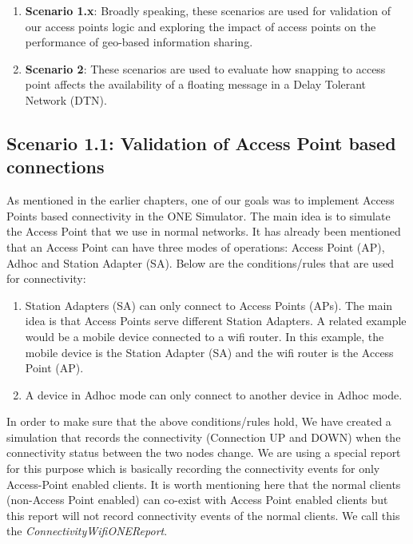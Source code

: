 \begin{enumerate}
	\item \textbf{Scenario 1.x}: Broadly speaking, these scenarios are used for validation of our access points logic and exploring the impact of access points on the performance of geo-based information sharing.
	\item \textbf{Scenario 2}: These scenarios are used to evaluate how snapping to access point affects the availability of a floating message in a Delay Tolerant Network (DTN).
\end{enumerate}
\newpage
\subsection{Scenario 1.1: Validation of Access Point based connections}
As mentioned in the earlier chapters, one of our goals was to implement Access Points based connectivity in the ONE Simulator. The main idea is to simulate the Access Point that we use in normal networks. It has already been mentioned that an Access Point can have three modes of operations: Access Point (AP), Adhoc and Station Adapter (SA). Below are the conditions/rules that are used for connectivity:
\begin{enumerate}
	\item Station Adapters (SA) can only connect to Access Points (APs). The main idea is that Access Points serve different Station Adapters. A related example would be a mobile device connected to a wifi router. In this example, the mobile device is the Station Adapter (SA) and the wifi router is the Access Point (AP).
   	\item A device in Adhoc mode can only connect to another device in Adhoc mode.
\end{enumerate}
In order to make sure that the above conditions/rules hold, We have created a simulation that records the connectivity (Connection UP and DOWN) when the connectivity status between the two nodes change. We are using a special report for this purpose which is basically recording the connectivity events for only Access-Point enabled clients. It is worth mentioning here that the normal clients (non-Access Point enabled) can co-exist with Access Point enabled clients but this report will not record connectivity events of the normal clients. We call this the \textit{ConnectivityWifiONEReport}.
\vspace{3mm}
